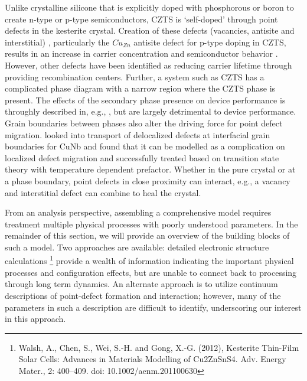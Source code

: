 \documentclass[11pt]{article}
\begin{document}
  Unlike crystalline silicone that is explicitly doped with
  phosphorous or boron to create n-type or p-type semiconductors, CZTS
  is `self-doped' through point defects in the kesterite
  crystal. Creation of these defects (vacancies, antisite and
  interstitial) , particularly the $Cu_{Zn}$ antisite defect for
  p-type doping in CZTS, results in an increase in carrier
  concentration and semiconductor behavior \cite{JiangY13}.  However,
  other defects have been identified as reducing carrier lifetime
  through providing recombination centers. Further, a system such as
  CZTS has a complicated phase diagram with a narrow region where the
  CZTS phase is present. The effects of the secondary phase presence
  on device performance is throughly described in, e.g.,
  \cite{Flammersberger}, but are largely detrimental to device
  performance. Grain boundaries between phases also alter the driving
  force for point defect migration. \cite{Kolluri12} looked into
  transport of delocalized defects at interfacial grain boundaries for
  CuNb and found that it can be modelled as a complication on
  localized defect migration and successfully treated based on
  transition state theory with temperature dependent
  prefactor. Whether in the pure crystal or at a phase boundary, point
  defects in close proximity can interact, e.g., a vacancy and
  interstitial defect can combine to heal the crystal. 

  From an analysis perspective, assembling a comprehensive model
  requires treatment multiple physical processes with poorly
  understood parameters. In the remainder of this section, we will
  provide an overview of the building blocks of such a model. Two
  approaches are available: detailed electronic structure calculations
  \footnote{Walsh, A., Chen, S., Wei, S.-H. and Gong, X.-G. (2012),
    Kesterite Thin-Film Solar Cells: Advances in Materials Modelling
    of Cu2ZnSnS4. Adv. Energy Mater., 2: 400–409. doi:
    10.1002/aenm.201100630} provide a wealth of information indicating
  the important physical processes and configuration effects, but are
  unable to connect back to processing through long term dynamics. An
  alternate approach is to utilize continuum descriptions of
  point-defect formation and interaction; however, many of the
  parameters in such a description are difficult to identify,
  underscoring our interest in this approach.
\end{document}
